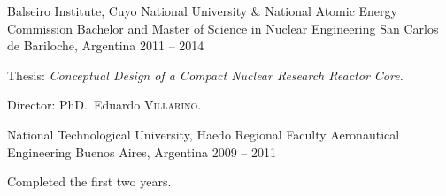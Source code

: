 
\begin{cventries}

  \cventry
    {Balseiro Institute, Cuyo National University \& National Atomic Energy Commission}
    {Bachelor and Master of Science in Nuclear Engineering}
    {San Carlos de Bariloche, Argentina}
    {2011 -- 2014}
    {
      \begin{cvitems}
        \item{Thesis: \emph{Conceptual Design of a Compact Nuclear Research Reactor Core.}}
        \item{Director: PhD.~Eduardo \textsc{Villarino}.}
      \end{cvitems}
      \vspace{1em}
    }

  \cventry
    {National Technological University, Haedo Regional Faculty}
    {Aeronautical Engineering}
    {Buenos Aires, Argentina}
    {2009 -- 2011}
    {
      \begin{cvitems}
        \item{Completed the first two years.}
      \end{cvitems}
    }

\end{cventries}
